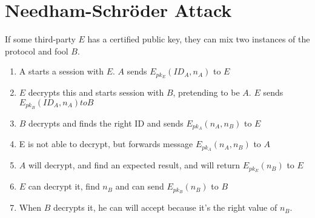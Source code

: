     \section{Needham-Schröder Attack}
                \begin{frame}
                    If some third-party $E$ has a certified public key, they can mix two instances of the protocol and fool $B$.  

                    \begin{enumerate}
                        \item A starts a session with $E$. $A$ sends $E_{pk_E}(ID_A, n_A)$ to $E$
                        \item $E$ decrypts this and starts session with $B$, pretending to be $A$. $E$ sends $E_{pk_B}(ID_A, n_A) to B$
                        \item $B$ decrypts and finds the right ID and sends $E_{pk_A}(n_A, n_B)$ to $E$
                        \item E is not able to decrypt, but forwards message $E_{pk_A}(n_A, n_B)$ to $A$
                        \item $A$ will decrypt, and find an expected result, and will return $E_{pk_E}(n_B)$ to $E$
                        \item $E$ can decrypt it, find $n_B$ and can send $E_{pk_B}(n_B)$ to $B$
                        \item When $B$ decrypts it, he can will accept because it's  the right value of $n_B$. 
                    \end{enumerate}
                \end{frame}

